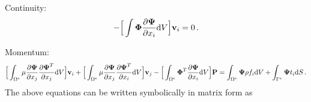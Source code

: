 \documentclass[]{article}
\begin{document}
Continuity:
\begin{equation}\label{eq9}
	\begin{aligned}
		-\Big[\int \boldsymbol{\Phi} \frac{\partial \boldsymbol{\Psi}}{\partial x_i} \mathrm{d}V \Big] \mathbf{v}_i = 0\thinspace.
	\end{aligned}
\end{equation}

Momentum:
\begin{equation}\label{eq10}
	\begin{aligned}
		\Big[\int_{\Omega^e} \mu  \frac{\partial \boldsymbol{\Psi}}{\partial x_j}  \frac{\partial \boldsymbol{\Psi}^T}{\partial x_j}\mathrm{d}V \Big] \mathbf{v}_i
		+ \Big[\int_{\Omega^e} \mu  \frac{\partial \boldsymbol{\Psi}}{\partial x_j}  \frac{\partial \boldsymbol{\Psi}^T}{\partial x_i}\mathrm{d}V \Big] \mathbf{v}_j
		- \Big[\int_{\Omega^e} \boldsymbol{\Phi}^T \frac{\partial \boldsymbol{\Psi}}{\partial x_i} \mathrm{d}V \Big] \mathbf{P}
		=\int_{\Omega^e} \boldsymbol{\Psi} \rho f_i \mathrm{d}V+\int_{\Gamma^e} \boldsymbol{\Psi} t_i \mathrm{d}S\thinspace.
	\end{aligned}
\end{equation}
The above equations can be written symbolically in matrix form as
\end{document}
